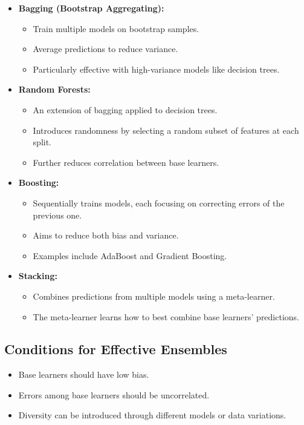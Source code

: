 \documentclass{article}
\begin{document}
\begin{itemize}
    \item \textbf{Bagging (Bootstrap Aggregating):}
    \begin{itemize}
        \item Train multiple models on bootstrap samples.
        \item Average predictions to reduce variance.
        \item Particularly effective with high-variance models like decision trees.
    \end{itemize}
    \item \textbf{Random Forests:}
    \begin{itemize}
        \item An extension of bagging applied to decision trees.
        \item Introduces randomness by selecting a random subset of features at each split.
        \item Further reduces correlation between base learners.
    \end{itemize}
    \item \textbf{Boosting:}
    \begin{itemize}
        \item Sequentially trains models, each focusing on correcting errors of the previous one.
        \item Aims to reduce both bias and variance.
        \item Examples include AdaBoost and Gradient Boosting.
    \end{itemize}
    \item \textbf{Stacking:}
    \begin{itemize}
        \item Combines predictions from multiple models using a meta-learner.
        \item The meta-learner learns how to best combine base learners' predictions.
    \end{itemize}
\end{itemize}

\subsection{Conditions for Effective Ensembles}

\begin{itemize}
    \item Base learners should have low bias.
    \item Errors among base learners should be uncorrelated.
    \item Diversity can be introduced through different models or data variations.
\end{itemize}
\end{document}
